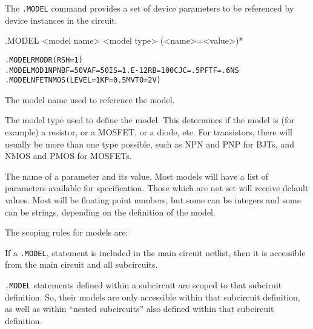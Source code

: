 

\label{modelCommand}
The \texttt{.MODEL} command provides a set of device parameters to be
referenced  by device instances in the circuit.

\begin{Command}

\format
.MODEL <model name> <model type> (<name>=<value>)*

\examples
\begin{alltt}
.MODEL RMOD R (RSH=1)
.MODEL MOD1 NPN BF=50 VAF=50 IS=1.E-12 RB=100 CJC=.5PF TF=.6NS
.MODEL NFET NMOS(LEVEL=1 KP=0.5M VTO=2V)
\end{alltt}

\arguments

\begin{Arguments}

The model name used to reference the model.


The model type used to define the model.  This determines if the model
is (for example) a resistor, or a MOSFET, or a diode, etc.  For
transistors, there will usually be more than one type possible, such as
NPN and PNP for BJTs, and NMOS and PMOS for MOSFETs.


The name of a parameter and its value.  Most models will have a list of
parameters available for specification.  Those which are not set will
receive default values.  Most will be floating point numbers, but some
can be integers and some can be strings, depending on the definition of
the model.

\end{Arguments}

\comments
{}The scoping rules for models are:
\begin{XyceItemize}
\item If a \texttt{.MODEL}, statement is included in the main circuit 
netlist, then it is accessible from the main circuit and all subcircuits. 
\item \texttt{.MODEL} statements defined within a subcircuit are scoped 
to that subciruit definition.  So, their models are only accessible within 
that subcircuit definition, as well as within ``nested subcircuits'' also 
defined within that subcircuit definition.
\end{XyceItemize}


\end{Command}
